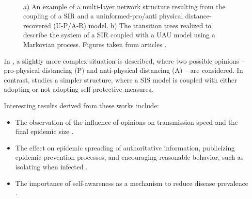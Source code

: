 \begin{figure}[]
	\centering
	 \quad
	 \\
	\caption[Multiplex networks]{a) An example of a multi-layer network structure resulting from the coupling of a SIR and a uninformed-pro/anti physical distance-recovered (U-P/A-R) model. b) The transition trees realized to describe the system of a SIR coupled  with a UAU model using a Markovian process. Figures taken from articles \cite{Peng2021, Silva2019}.}
	\label{fig:sir_example3}
\end{figure}

In \cite{Peng2021}, a slightly more complex situation is described, where two possible opinions -- pro-physical distancing (P) and anti-physical distancing (A) -- are considered. In contrast, \cite{Frieswijk_2022} studies a simpler structure, where a SIS model is coupled with either adopting or not adopting self-protective measures.\newpage

\noindent Interesting results derived from these works include: 
\begin{itemize} 
	\item The observation of the influence of opinions on transmission speed and the final epidemic size \cite{Peng2021}. 
	\item The effect on epidemic spreading of authoritative information, publicizing epidemic prevention processes, and encouraging reasonable behavior, such as isolating when infected \cite{Zuo_2021}. 
	\item The importance of self-awareness as a mechanism to reduce disease prevalence \cite{Silva2019}. 
\end{itemize}

